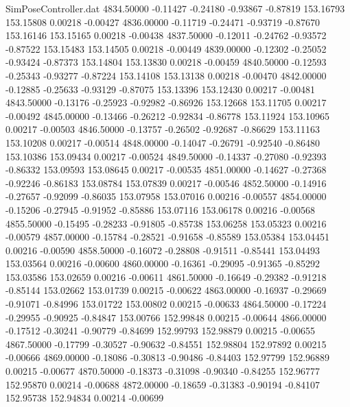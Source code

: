 \begin{filecontents}{SimPoseController.dat}
4834.50000   -0.11427   -0.24180    -0.93867   -0.87819  153.16793  153.15808    0.00218   -0.00427
4836.00000   -0.11719   -0.24471    -0.93719   -0.87670  153.16146  153.15165    0.00218   -0.00438
4837.50000   -0.12011   -0.24762    -0.93572   -0.87522  153.15483  153.14505    0.00218   -0.00449
4839.00000   -0.12302   -0.25052    -0.93424   -0.87373  153.14804  153.13830    0.00218   -0.00459
4840.50000   -0.12593   -0.25343    -0.93277   -0.87224  153.14108  153.13138    0.00218   -0.00470
4842.00000   -0.12885   -0.25633    -0.93129   -0.87075  153.13396  153.12430    0.00217   -0.00481
4843.50000   -0.13176   -0.25923    -0.92982   -0.86926  153.12668  153.11705    0.00217   -0.00492
4845.00000   -0.13466   -0.26212    -0.92834   -0.86778  153.11924  153.10965    0.00217   -0.00503
4846.50000   -0.13757   -0.26502    -0.92687   -0.86629  153.11163  153.10208    0.00217   -0.00514
4848.00000   -0.14047   -0.26791    -0.92540   -0.86480  153.10386  153.09434    0.00217   -0.00524
4849.50000   -0.14337   -0.27080    -0.92393   -0.86332  153.09593  153.08645    0.00217   -0.00535
4851.00000   -0.14627   -0.27368    -0.92246   -0.86183  153.08784  153.07839    0.00217   -0.00546
4852.50000   -0.14916   -0.27657    -0.92099   -0.86035  153.07958  153.07016    0.00216   -0.00557
4854.00000   -0.15206   -0.27945    -0.91952   -0.85886  153.07116  153.06178    0.00216   -0.00568
4855.50000   -0.15495   -0.28233    -0.91805   -0.85738  153.06258  153.05323    0.00216   -0.00579
4857.00000   -0.15784   -0.28521    -0.91658   -0.85589  153.05384  153.04451    0.00216   -0.00590
4858.50000   -0.16072   -0.28808    -0.91511   -0.85441  153.04493  153.03564    0.00216   -0.00600
4860.00000   -0.16361   -0.29095    -0.91365   -0.85292  153.03586  153.02659    0.00216   -0.00611
4861.50000   -0.16649   -0.29382    -0.91218   -0.85144  153.02662  153.01739    0.00215   -0.00622
4863.00000   -0.16937   -0.29669    -0.91071   -0.84996  153.01722  153.00802    0.00215   -0.00633
4864.50000   -0.17224   -0.29955    -0.90925   -0.84847  153.00766  152.99848    0.00215   -0.00644
4866.00000   -0.17512   -0.30241    -0.90779   -0.84699  152.99793  152.98879    0.00215   -0.00655
4867.50000   -0.17799   -0.30527    -0.90632   -0.84551  152.98804  152.97892    0.00215   -0.00666
4869.00000   -0.18086   -0.30813    -0.90486   -0.84403  152.97799  152.96889    0.00215   -0.00677
4870.50000   -0.18373   -0.31098    -0.90340   -0.84255  152.96777  152.95870    0.00214   -0.00688
4872.00000   -0.18659   -0.31383    -0.90194   -0.84107  152.95738  152.94834    0.00214   -0.00699

\end{filecontents}

